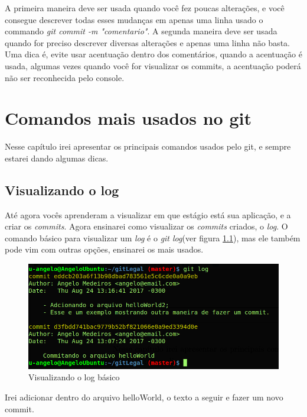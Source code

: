 \documentclass[12pt,openright,oneside,a4paper,english,brazil]{abntex2}
\begin{document}
A primeira maneira deve ser usada quando você fez poucas alterações, e você consegue descrever todas esses mudanças em apenas uma linha usado o commando \textit{git commit -m "comentario"}. A segunda maneira deve ser usada quando for preciso descrever diversas alterações e apenas uma linha não basta. Uma dica é, evite usar acentuação dentro dos comentários, quando a acentuação é usada, algumas vezes quando você for visualizar os commits, a acentuação poderá não ser reconhecida pelo console.

\chapter{Comandos mais usados no git}

Nesse capítulo irei apresentar os principais comandos usados pelo git, e sempre estarei dando algumas dicas.

\section{Visualizando o log}

Até agora vocês aprenderam a visualizar em que estágio está sua aplicação, e a criar os \textit{commits}. Agora ensinarei como visualizar os \textit{commits} criados, o \textit{log}. O comando básico para visualizar um \textit{log} é o \textit{git log}(ver figura \ref{gitlog}), mas ele também pode vim com outras opções, ensinarei os mais usados.

\begin{figure}[h]
	\caption{\label{gitlog}Visualizando o log básico}
	\begin{center}
		\includegraphics[width=1\linewidth]{gitlog}
	\end{center}
\end{figure}

Irei adicionar dentro do arquivo helloWorld, o texto a seguir e fazer um novo commit. 
\end{document}
